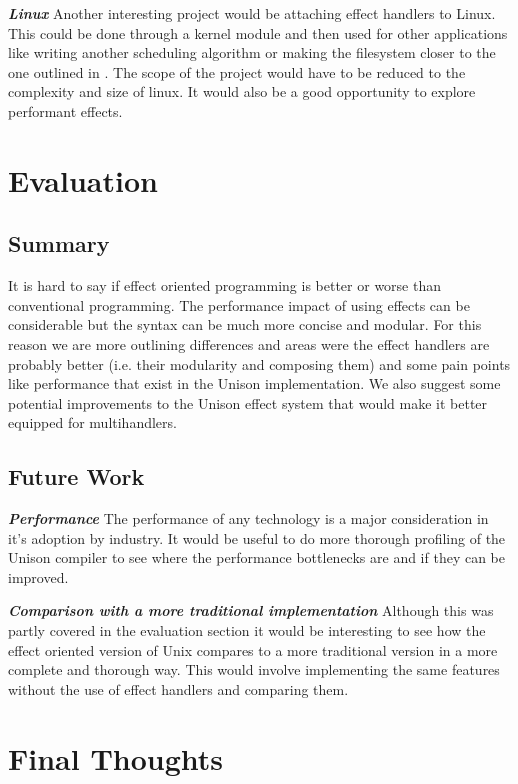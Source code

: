\documentclass[logo,bsc,singlespacing,parskip]{infthesis}
\begin{document}
\emph{\textbf{Linux}} Another interesting project would be attaching effect handlers to Linux. This could be done through a kernel module and then used for other applications like writing another scheduling algorithm or making the filesystem closer to the one outlined in \cite{DBLP:conf/context/KiselyovS07}. The scope of the project would have to be reduced to the complexity and size of linux. It would also be a good opportunity to explore performant effects.

\section{Evaluation}

\subsection{Summary}

It is hard to say if effect oriented programming is better or worse than
conventional programming. The performance impact of using effects can be
considerable but the syntax can be much more concise and modular. For this
reason we are more outlining differences and areas were the effect handlers are
probably better (i.e. their modularity and composing them) and some pain points
like performance that exist in the Unison implementation. We also suggest some
potential improvements to the Unison effect system that would make it better
equipped for multihandlers.

\subsection{Future Work}

\emph{\textbf{Performance}} The performance of any technology is a major
consideration in it's adoption by industry. It would be useful to do more
thorough profiling of the Unison compiler to see where the performance
bottlenecks are and if they can be improved.

\emph{\textbf{Comparison with a more traditional implementation}} Although this 
was partly covered in the evaluation section it would be interesting to see how
the effect oriented version of Unix compares to a more traditional version in
a more complete and thorough way. This would involve implementing the same
features without the use of effect handlers and comparing them.

\section{Final Thoughts}
\end{document}
